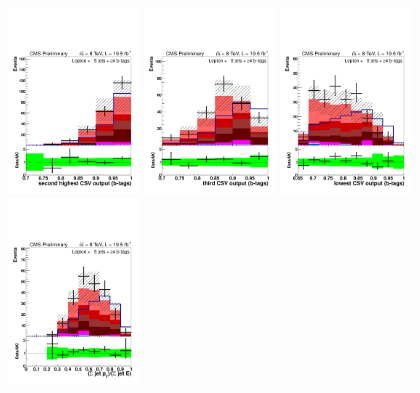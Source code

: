 \begin{figure}[hbtp]
\begin{center}
   \includegraphics[width=0.31\textwidth]{Figures/Analysis_2_Diagrams/LJ_plots_lep/5j4t/lep_jet_csv_2_5j4t_cumulative_wRatio_noLegend_lin.pdf}
   \includegraphics[width=0.31\textwidth]{Figures/Analysis_2_Diagrams/LJ_plots_lep/5j4t/lep_jet_csv_3_5j4t_cumulative_wRatio_noLegend_lin.pdf}
   \includegraphics[width=0.31\textwidth]{Figures/Analysis_2_Diagrams/LJ_plots_lep/5j4t/lep_lowest_btag_5j4t_cumulative_wRatio_noLegend_lin.pdf}
   \includegraphics[width=0.31\textwidth]{Figures/Analysis_2_Diagrams/LJ_plots_lep/5j4t/lep_pt_all_jets_over_E_all_jets_5j4t_cumulative_wRatio_noLegend_lin.pdf}

\end{center}
\end{figure}
